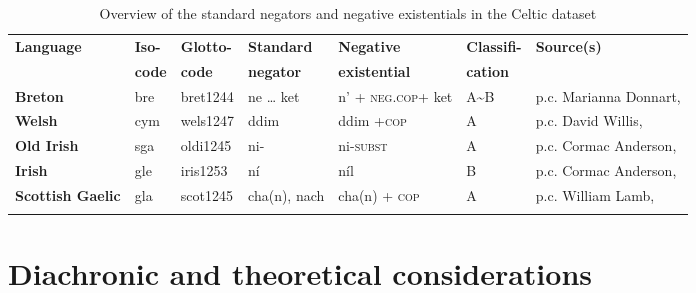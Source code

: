 ﻿\documentclass[output=paper]{langsci/langscibook}
\begin{document}
\begin{table}\begin{small}
\caption{Overview of the standard negators and negative existentials in the
Celtic dataset}\label{tab:ieur-class-Celtic}
\begin{tabularx}{\textwidth}{@{} p{14mm} l l p{14mm} p{16mm} l Q @{}}
\lsptoprule
\textbf{Language} & \textbf{Iso-} & \textbf{Glotto-} & \textbf{Standard} &
\textbf{Negative} & \textbf{Classifi-} & \textbf{Source(s)}\\
& \textbf{code} & \textbf{code} & \textbf{negator} & \textbf{existential} &
\textbf{cation} \\
\midrule
    \textbf{Breton} & bre & bret1244 & ne … ket & n’ +\newline
    \textsc{neg.cop}\newline +  ket & A{\textasciitilde}B & p.c. Marianna Donnart, \citet{Press1986}\\
\midrule
    \textbf{Welsh} & cym & wels1247 & ddim & ddim +\newline \textsc{cop} & A & p.c. David Willis, \citet{King2003}\\
\midrule
\textbf{Old Irish} & sga & oldi1245 & ni- & ni-\textsc{subst} & A & p.c. Cormac
Anderson, \textcites{Stenson1981}{Stenson2008}\\
\midrule
\textbf{Irish} & gle & iris1253 & ní & níl & B & p.c. Cormac Anderson, \citet{McCone2005}\\
\midrule
\textbf{Scottish Gaelic} & gla & scot1245 & cha(n), nach & cha(n) +\newline
    \textsc{cop} & A & p.c. William Lamb, \citet{Lamb2001}\\
\lspbottomrule
\end{tabularx}
\end{small}\end{table}

\section{Diachronic and theoretical considerations}\label{sec:ieur-5}
\end{document}
